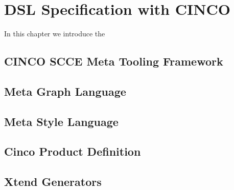 
\chapter{DSL Specification with CINCO}\label{ch:DSL}
In this chapter we introduce the 
\section{CINCO SCCE Meta Tooling Framework}\label{sec:CTF}
\section{Meta Graph Language}\label{sec:MGL}
\section{Meta Style Language}\label{sec:MSL}
\section{Cinco Product Definition}\label{sec:CPD}
\section{Xtend Generators}\label{sec:GEN}
